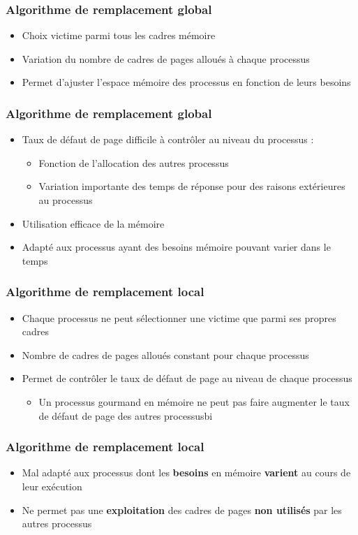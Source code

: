 \begin{frame}
\frametitle{Algorithme de remplacement global}
\begin{itemize}
\item Choix victime parmi tous les cadres mémoire
\item Variation du nombre de cadres de pages alloués à chaque processus
\item Permet d'ajuster l'espace mémoire des processus en fonction de leurs besoins
\end{itemize}
\end{frame}


\begin{frame}
\frametitle{Algorithme de remplacement global}
\begin{itemize}
\item Taux de défaut de page difficile à contrôler au niveau du processus :
\begin{itemize}
\item Fonction de l'allocation des autres processus
\item Variation importante des temps de réponse pour des raisons extérieures au processus
\end{itemize}
\item Utilisation efficace de la mémoire
\item Adapté aux processus ayant des besoins mémoire pouvant varier dans le temps
\end{itemize}
\end{frame}


\begin{frame}
\frametitle{Algorithme de remplacement local}
\begin{itemize}
\item Chaque processus ne peut sélectionner une victime que parmi ses propres cadres
\item Nombre de cadres de pages alloués constant pour chaque processus
\item Permet de contrôler le taux de défaut de page au niveau de chaque processus
\begin{itemize}
\item Un processus gourmand en mémoire ne peut pas faire augmenter le taux de défaut de page des autres processusbi
\end{itemize}
\end{itemize}
\end{frame}


\begin{frame}
\frametitle{Algorithme de remplacement local}
\begin{itemize}
\item Mal adapté aux processus dont les \textbf{besoins} en mémoire \textbf{varient} au cours de leur exécution
\item Ne permet pas une \textbf{exploitation} des cadres de pages \textbf{non utilisés} par les autres processus
\end{itemize}
\end{frame}


